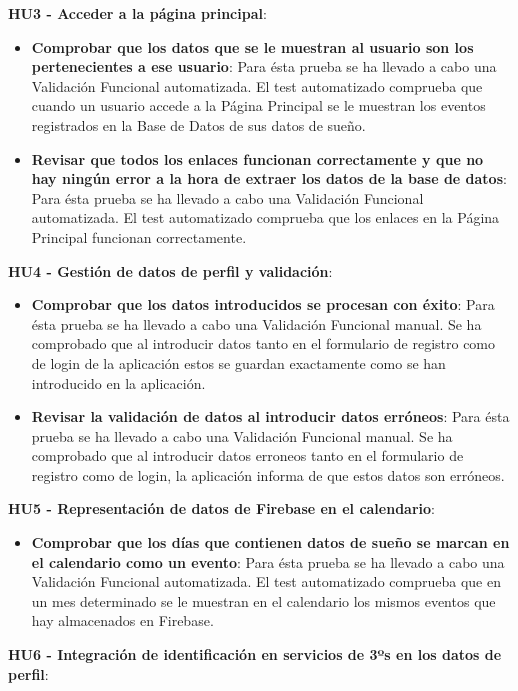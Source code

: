 \documentclass[11pt,openany]{book}
\begin{document}
\textbf{HU3 - Acceder a la página principal}:
 
\begin{itemize}
\item\textbf{Comprobar que los datos que se le muestran al usuario son los pertenecientes a ese usuario}: Para ésta prueba se ha llevado a cabo una Validación Funcional automatizada. El test automatizado comprueba que cuando un usuario accede a la Página Principal se le muestran los eventos registrados en la Base de Datos de sus datos de sueño.
\item\textbf{Revisar que todos los enlaces funcionan correctamente y que no hay ningún error a la hora de extraer los datos de la base de datos}: Para ésta prueba se ha llevado a cabo una Validación Funcional automatizada. El test automatizado comprueba que los enlaces en la Página Principal funcionan correctamente.
\end{itemize}
 
\textbf{HU4 - Gestión de datos de perfil y validación}:
 
\begin{itemize}
\item\textbf{Comprobar que los datos introducidos se procesan con éxito}: Para ésta prueba se ha llevado a cabo una Validación Funcional manual. Se ha comprobado que al introducir datos tanto en el formulario de registro como de login de la aplicación estos se guardan exactamente como se han introducido en la aplicación.
\item\textbf{Revisar la validación de datos al introducir datos erróneos}: Para ésta prueba se ha llevado a cabo una Validación Funcional manual. Se ha comprobado que al introducir datos erroneos tanto en el formulario de registro como de login, la aplicación informa de que estos datos son erróneos.
\end{itemize}
 
\textbf{HU5 - Representación de datos de Firebase en el calendario}:
 
\begin{itemize}
\item\textbf{Comprobar que los días que contienen datos de sueño se marcan en el calendario como un evento}: Para ésta prueba se ha llevado a cabo una Validación Funcional automatizada. El test automatizado comprueba que en un mes determinado se le muestran en el calendario los mismos eventos que hay almacenados en Firebase.
\end{itemize}
 
\textbf{HU6 - Integración de identificación en servicios de 3ºs en los datos de perfil}:
 
\end{document}
